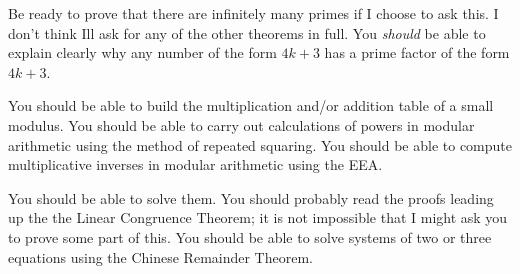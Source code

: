 \documentclass[12pt]{article}
\begin{document}
\begin{description}
\item[prime theorems:]    Be ready to prove that there are infinitely many primes if I choose to ask this.  I don't think Ill ask for any of the other theorems in full.  You {\em should\/} be able to explain clearly why any number of the form $4k+3$ has a prime factor of the form $4k+3$.

\item[modular calculations:]  You should be able to build the multiplication and/or addition table of a small modulus.
You should be able to carry out calculations of powers in modular arithmetic using the method of repeated squaring. You should be able to compute multiplicative inverses in modular arithmetic using the EEA.

\item[linear congruences:]  You should be able to solve them.  You should probably read the
proofs leading up the the Linear Congruence Theorem;   it is not impossible that I might ask you to prove some part of this.  You should be able to solve systems of two or three equations using the Chinese Remainder Theorem.

\item


\end{description}
\end{document}
